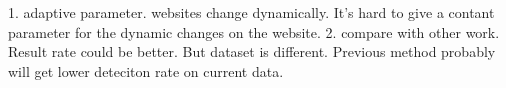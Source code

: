 1. adaptive parameter. websites change dynamically. It's hard to give a contant  parameter for the dynamic changes on the website.
2. compare with other work. Result rate could be better. But dataset is different. Previous method probably will get lower deteciton rate on current data. 
